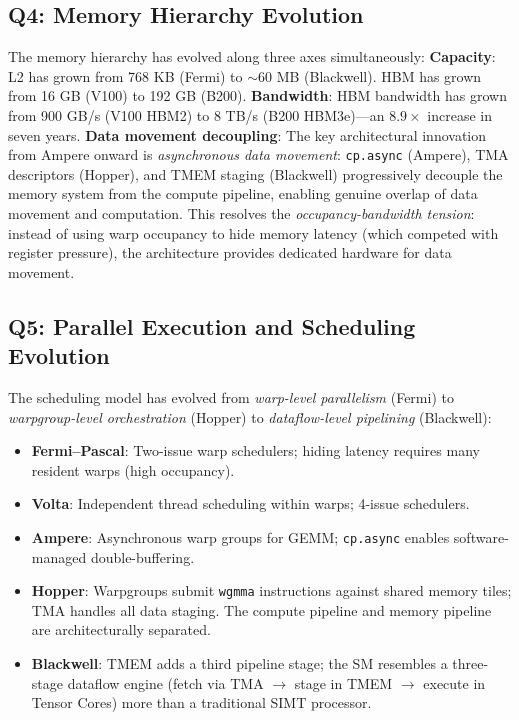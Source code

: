 \documentclass[10pt,twocolumn]{article}
\begin{document}
\subsection{Q4: Memory Hierarchy Evolution}

The memory hierarchy has evolved along three axes simultaneously:
\textbf{Capacity}: L2 has grown from 768 KB (Fermi) to $\sim$60 MB (Blackwell). HBM has grown from 16 GB (V100) to 192 GB (B200).
\textbf{Bandwidth}: HBM bandwidth has grown from 900 GB/s (V100 HBM2) to 8 TB/s (B200 HBM3e)—an $8.9\times$ increase in seven years.
\textbf{Data movement decoupling}: The key architectural innovation from Ampere onward is \textit{asynchronous data movement}: \texttt{cp.async} (Ampere), TMA descriptors (Hopper), and TMEM staging (Blackwell) progressively decouple the memory system from the compute pipeline, enabling genuine overlap of data movement and computation. This resolves the \textit{occupancy-bandwidth tension}: instead of using warp occupancy to hide memory latency (which competed with register pressure), the architecture provides dedicated hardware for data movement.

\subsection{Q5: Parallel Execution and Scheduling Evolution}

The scheduling model has evolved from \textit{warp-level parallelism} (Fermi) to \textit{warpgroup-level orchestration} (Hopper) to \textit{dataflow-level pipelining} (Blackwell):
\begin{itemize}
\item \textbf{Fermi--Pascal}: Two-issue warp schedulers; hiding latency requires many resident warps (high occupancy).
\item \textbf{Volta}: Independent thread scheduling within warps; 4-issue schedulers.
\item \textbf{Ampere}: Asynchronous warp groups for GEMM; \texttt{cp.async} enables software-managed double-buffering.
\item \textbf{Hopper}: Warpgroups submit \texttt{wgmma} instructions against shared memory tiles; TMA handles all data staging. The compute pipeline and memory pipeline are architecturally separated.
\item \textbf{Blackwell}: TMEM adds a third pipeline stage; the SM resembles a three-stage dataflow engine (fetch via TMA $\to$ stage in TMEM $\to$ execute in Tensor Cores) more than a traditional SIMT processor.
\end{itemize}
\end{document}
